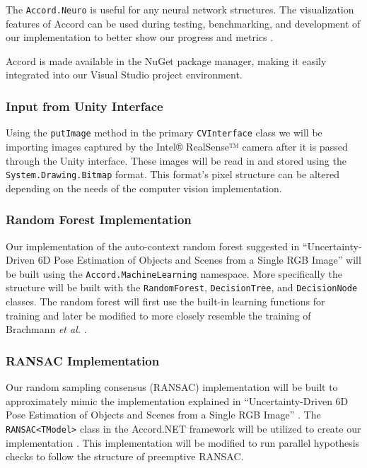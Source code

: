 \documentclass[12pt]{article}
\begin{document}
The \texttt{Accord.Neuro} is useful for any neural network structures.
The visualization features of Accord can be used during testing,
benchmarking, and development of our implementation to better show our
progress and metrics \autocite{accord}.

Accord is made available in the NuGet package manager, making it easily
integrated into our Visual Studio project environment.

\subsubsection{Input from Unity
Interface}\label{input-from-unity-interface}

Using the \texttt{putImage} method in the primary \texttt{CVInterface}
class we will be importing images captured by the Intel® RealSense™
camera after it is passed through the Unity interface. These images will
be read in and stored using the \texttt{System.Drawing.Bitmap} format.
This format's pixel structure can be altered depending on the needs of
the computer vision implementation.

\subsubsection{Random Forest
Implementation}\label{random-forest-implementation}

Our implementation of the auto-context random forest suggested in
``Uncertainty-Driven 6D Pose Estimation of Objects and Scenes from a
Single RGB Image'' will be built using the
\texttt{Accord.MachineLearning} namespace. More specifically the
structure will be built with the \texttt{RandomForest},
\texttt{DecisionTree}, and \texttt{DecisionNode} classes. The random
forest will first use the built-in learning functions for training and
later be modified to more closely resemble the training of Brachmann
\emph{et al.} \autocites{brachmann}{accord}.

\subsubsection{RANSAC Implementation}\label{ransac-implementation}

Our random sampling consensus (RANSAC) implementation will be built to
approximately mimic the implementation explained in ``Uncertainty-Driven
6D Pose Estimation of Objects and Scenes from a Single RGB Image''
\autocite{brachmann}. The \texttt{RANSAC\textless{}TModel\textgreater{}}
class in the Accord.NET framework will be utilized to create our
implementation \autocite{accord}. This implementation will be modified
to run parallel hypothesis checks to follow the structure of preemptive
RANSAC.
\end{document}

